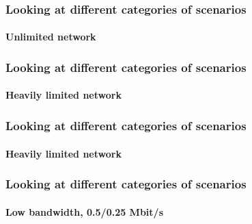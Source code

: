 
\begin{frame}

    \frametitle{Looking at different categories of scenarios}
    \framesubtitle{Unlimited network}

    \begin{overprint}
        \uncover<+->{}
    \end{overprint}

\end{frame}


\begin{frame}

    \frametitle{Looking at different categories of scenarios}
    \framesubtitle{Heavily limited network}

    \begin{overprint}
        \uncover<+->{}
    \end{overprint}

\end{frame}

\begin{frame}

    \frametitle{Looking at different categories of scenarios}
    \framesubtitle{Heavily limited network}

    \begin{overprint}
        \uncover<+->{}
    \end{overprint}

\end{frame}


\begin{frame}

    \frametitle{Looking at different categories of scenarios}
    \framesubtitle{Low bandwidth, 0.5/0.25 Mbit/s}

    \begin{overprint}
        \uncover<+->{}
    \end{overprint}

\end{frame}

